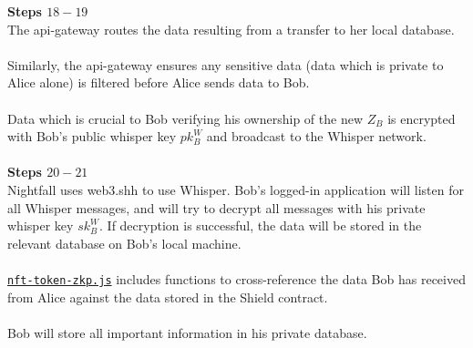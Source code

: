 \textbf{Steps $18 - 19$}
\ \\
The api-gateway routes the data resulting from a transfer to her local database.\\
\\
Similarly, the api-gateway ensures any sensitive data (data which is private to Alice alone) is filtered before Alice sends data to Bob.\\
\\
Data which is crucial to Bob verifying his ownership of the new $Z_B$ is encrypted with Bob's public whisper key $pk^W_B$ and broadcast to the Whisper network.\\
\\

\textbf{Steps $20 - 21$}
\ \\
Nightfall uses web3.shh to use Whisper. Bob's logged-in application will listen for all Whisper messages, and will try to decrypt all messages with his private whisper key $sk^W_B$. If decryption is successful, the data will be stored in the relevant database on Bob's local machine.\\
\\
\hyperref[sec:nf-token-zkp]{\texttt{nft-token-zkp.js}} includes functions to cross-reference the data Bob has received from Alice against the data stored in the Shield contract.\\
\\
Bob will store all important information in his private database.


